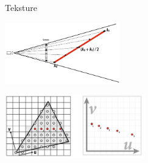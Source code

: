 \documentclass[9pt]{beamer}
\begin{document}
\begin{frame}{Teksture}
	\begin{center}
		\includegraphics[width=5cm]{./slike/slide_030.jpg}
	\end{center}

	\begin{center}
		\includegraphics[width=6cm]{./slike/slide_054.jpg}
	\end{center}
\end{frame}
\end{document}
